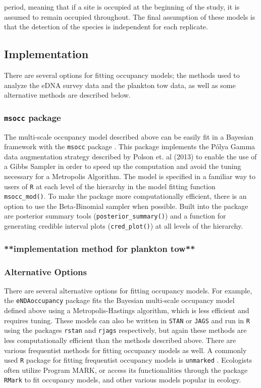 \documentclass[12pt]{article}\usepackage[]{graphicx}\usepackage[]{color}
\begin{document}
period, meaning that if a site is occupied at the beginning of the study, it is assumed to remain occupied throughout. The final assumption of these models is that the detection of the species is independent for each replicate. 

\subsection{Implementation}

There are several options for fitting occupancy models; the methods used to analyze the eDNA survey data and the plankton tow data, as well as some alternative methods are described below. 

\subsubsection{\texttt{msocc} package}

The multi-scale occupancy model described above \cite{Dorazio_Erickson} can be easily fit in a Bayesian framework with the \texttt{msocc} package \cite{Stratton}. This package implements the P\'{o}lya Gamma data augmentation strategy described by Polson et. al (2013) to enable the use of a Gibbs Sampler in order to speed up the computation and avoid the tuning necessary for a Metropolis Algorithm. The model is specified in a familiar way to users of \texttt{R} at each level of the hierarchy in the model fitting function \texttt{msocc\_mod()}. To make the package more computationally efficient, there is an option to use the Beta-Binomial sampler when possible. Built into the package are posterior summary tools (\texttt{posterior\_summary()}) and a function for generating credible interval plots (\texttt{cred\_plot()}) at all levels of the hierarchy. 

\subsubsection{**implementation method for plankton tow**}

\subsubsection{Alternative Options}

There are several alternative options for fitting occupancy models. For example, the \texttt{eNDAoccupancy} \cite{Dorazio_Erickson} package fits the Bayesian multi-scale occupancy model defined above using a Metropolis-Hastings algorithm, which is less efficient and requires tuning. These models can also be written in \texttt{STAN} or \texttt{JAGS} and run in \texttt{R} using the packages \texttt{rstan} \cite{rstan} and \texttt{rjags} \cite{rjags} respectively, but again these methods are less computationally efficient than the methods described above. There are various frequentist methods for fitting occupancy models as well.  A commonly used \texttt{R} package for fitting frequentist occupancy models is \texttt{unmarked} \cite{unmarked}. Ecologists often utilize Program MARK, or access its functionalities through the  package \texttt{RMark} \cite{RMark} to fit occupancy models, and other various models popular in ecology.
\end{document}
